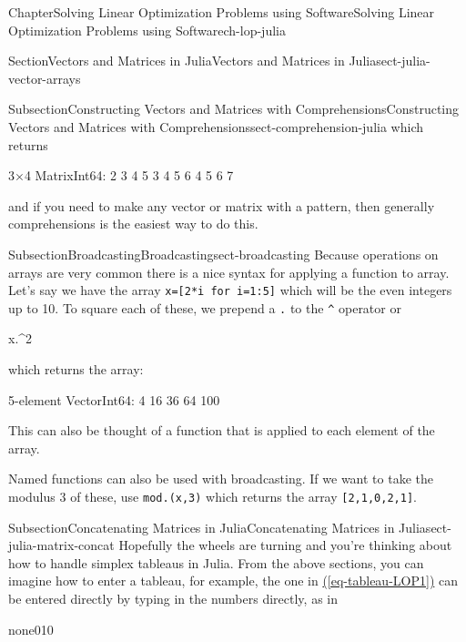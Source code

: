 \documentclass[oneside,10pt,]{book}
\newcommand{\xreffont}{\relax}
\newcommand{\mono}[1]{\texttt{#1}}
\numberwithin{equation}{section}
\begin{document}
\begin{chapterptx}{Chapter}{Solving Linear Optimization Problems using Software}{}{Solving Linear Optimization Problems using Software}{}{}{ch-lop-julia}
\begin{sectionptx}{Section}{Vectors and Matrices in Julia}{}{Vectors and Matrices in Julia}{}{}{sect-julia-vector-arrays}
\begin{subsectionptx}{Subsection}{Constructing Vectors and Matrices with Comprehensions}{}{Constructing Vectors and Matrices with Comprehensions}{}{}{sect-comprehension-julia}
which returns%
\par
%
\begin{codedisplay}
3×4 Matrix{Int64}:
 2  3  4  5
 3  4  5  6
 4  5  6  7
\end{codedisplay}
%
\par
and if you need to make any vector or matrix with a pattern, then generally comprehensions is the easiest way to do this.%
\end{subsectionptx}
%
%
\typeout{************************************************}
\typeout{************************************************}
%
\begin{subsectionptx}{Subsection}{Broadcasting}{}{Broadcasting}{}{}{sect-broadcasting}
Because operations on arrays are very common there is a nice syntax for applying a function to array. Let's say we have the array \mono{x=[2*i for i=1:5]} which will be the even integers up to 10. To square each of these, we prepend a \mono{.} to the \mono{\textasciicircum{}} operator or%
\par
%
\begin{codedisplay}
x.^2
\end{codedisplay}
%
\par
which returns the array:%
\par
%
\begin{codedisplay}
5-element Vector{Int64}:
   4
  16
  36
  64
 100
\end{codedisplay}
%
\par
This can also be thought of a function that is applied to each element of the array.%
\par
Named functions can also be used with broadcasting. If we want to take the modulus 3 of these, use \mono{mod.(x,3)} which returns the array \mono{[2,1,0,2,1]}.%
\end{subsectionptx}
%
%
\typeout{************************************************}
\typeout{************************************************}
%
\begin{subsectionptx}{Subsection}{Concatenating Matrices in Julia}{}{Concatenating Matrices in Julia}{}{}{sect-julia-matrix-concat}
Hopefully the wheels are turning and you're thinking about how to handle simplex tableaus in Julia. From the above sections, you can imagine how to enter a tableau, for example, the one in \hyperref[eq-tableau-LOP1]{({\xreffont\ref{eq-tableau-LOP1}})} can be entered directly by typing in the numbers directly, as in%
\begin{program}{none}{0}{1}{0}

\end{program}
\end{subsectionptx}
\end{sectionptx}
\end{chapterptx}
\end{document}
